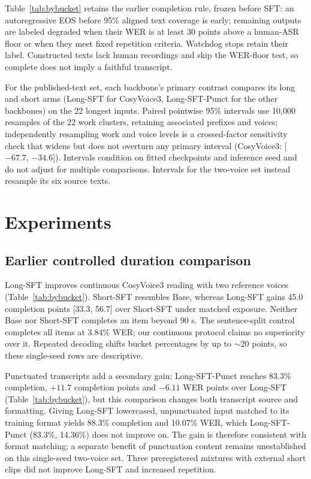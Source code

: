 \documentclass{article}
\newcommand{\model}{CosyVoice3}
\begin{document}
Table~\ref{tab:bybucket} retains the earlier completion rule, frozen before SFT:
an autoregressive EOS before 95\% aligned text coverage is early; remaining
outputs are labeled degraded when their WER is at least 30 points above a
human-ASR floor or when they meet fixed repetition criteria. Watchdog stops retain
their label. Constructed texts lack
human recordings and skip the WER-floor test, so complete does not imply a
faithful transcript.


For the published-text set, each backbone's primary contrast compares its long and short
arms (Long-SFT for CosyVoice3, Long-SFT-Punct for the other backbones)
on the 22 longest inputs. Paired pointwise 95\% intervals use 10,000 resamples
of the 22 work clusters, retaining associated prefixes and voices; independently
resampling work and voice levels is a crossed-factor sensitivity check that widens
but does not overturn any primary interval (CosyVoice3: [$-67.7$, $-34.6$]).
Intervals condition on fitted checkpoints and inference seed and do not adjust
for multiple comparisons. Intervals for the two-voice set instead resample its
six source texts.

\section{Experiments}
\label{sec:experiments}

\subsection{Earlier controlled duration comparison}
\label{sec:duration}

Long-SFT improves continuous \model{} reading with two reference voices
(Table~\ref{tab:bybucket}).
Short-SFT resembles Base, whereas Long-SFT gains 45.0 completion points [33.3, 56.7] over Short-SFT under matched exposure.  Neither Base nor Short-SFT
completes an item beyond 90 s. The sentence-split control completes all items
at 3.84\% WER; our continuous protocol claims no superiority over it.  Repeated
decoding shifts bucket percentages by up to $\sim$20 points, so these single-seed
rows are descriptive.

Punctuated transcripts add a secondary gain: Long-SFT-Punct reaches 83.3\%
completion, $+11.7$ completion points and $-6.11$ WER points over Long-SFT
(Table~\ref{tab:bybucket}), but this comparison changes both transcript source
and formatting.  Giving Long-SFT lowercased, unpunctuated input
matched to its training format yields 88.3\% completion and 10.07\% WER, which
Long-SFT-Punct (83.3\%, 14.36\%) does not improve on.  The gain is therefore
consistent with format matching; a separate benefit of punctuation content remains
unestablished on this single-seed two-voice set.  Three preregistered mixtures with
external short clips did not improve Long-SFT and increased repetition.
\end{document}
